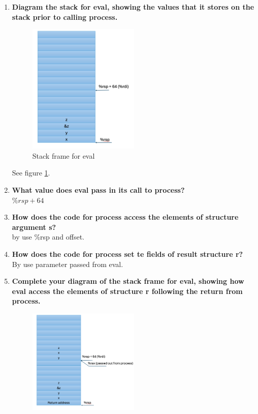 \documentclass{article}
\begin{document}
\begin{enumerate}[label=\textbf{\Alph*.}]
	\item \textbf{Diagram the stack for eval, showing the values that it stores on
	the stack prior to calling process.} \\
	\begin{figure}[h]
		\centering
		\includegraphics[width=0.5\textwidth]{stack1}
		\caption{Stack frame for eval}
		\label{fig:stack1}
	\end{figure}
	See figure \ref{fig:stack1}.
	\item \textbf{What value does eval pass in its call to process?} \\
	$\%rsp + 64$
	\item \textbf{How does the code for process access the elements of structure argument s?} \\
	by use \%rsp and offset.
	\item \textbf{How does the code for process set te fields of result structure r?} \\
	By use parameter passed from eval.
	\item \textbf{Complete your diagram of the stack frame for eval, showing how eval
	access the elements of structure r following the return from process.} \\
	\begin{figure}[h]
		\centering
		\includegraphics[width=0.5\textwidth]{stack2}

\end{figure}
\end{enumerate}
\end{document}
